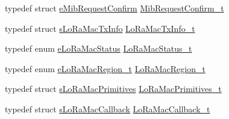 \begin{DoxyCompactItemize}
\item 
typedef struct \mbox{\hyperlink{structe_mib_request_confirm}{e\+Mib\+Request\+Confirm}} \mbox{\hyperlink{group___l_o_r_a_m_a_c_ga9269d5ae88dd157a58e9d60f680d63f0}{Mib\+Request\+Confirm\+\_\+t}}
\item 
typedef struct \mbox{\hyperlink{structs_lo_ra_mac_tx_info}{s\+Lo\+Ra\+Mac\+Tx\+Info}} \mbox{\hyperlink{group___l_o_r_a_m_a_c_ga3219fea2f3c3355f80d2ed29db613683}{Lo\+Ra\+Mac\+Tx\+Info\+\_\+t}}
\item 
typedef enum \mbox{\hyperlink{group___l_o_r_a_m_a_c_ga1d18f26b344040b3ec5c3db662919661}{e\+Lo\+Ra\+Mac\+Status}} \mbox{\hyperlink{group___l_o_r_a_m_a_c_ga30bd25657e10480f8605ee951b0ecfbd}{Lo\+Ra\+Mac\+Status\+\_\+t}}
\item 
typedef enum \mbox{\hyperlink{group___l_o_r_a_m_a_c_ga5d863ec55bc300e0ffeef88bcbeb70af}{e\+Lo\+Ra\+Mac\+Region\+\_\+t}} \mbox{\hyperlink{group___l_o_r_a_m_a_c_ga80c48efda9ae02e14b58160d34a798dd}{Lo\+Ra\+Mac\+Region\+\_\+t}}
\item 
typedef struct \mbox{\hyperlink{structs_lo_ra_mac_primitives}{s\+Lo\+Ra\+Mac\+Primitives}} \mbox{\hyperlink{group___l_o_r_a_m_a_c_gafc0443f59f49d8597c0accb5e6074c44}{Lo\+Ra\+Mac\+Primitives\+\_\+t}}
\item 
typedef struct \mbox{\hyperlink{structs_lo_ra_mac_callback}{s\+Lo\+Ra\+Mac\+Callback}} \mbox{\hyperlink{group___l_o_r_a_m_a_c_ga2899a8ebbefe08452ddf89e14159a160}{Lo\+Ra\+Mac\+Callback\+\_\+t}}
\end{DoxyCompactItemize}
